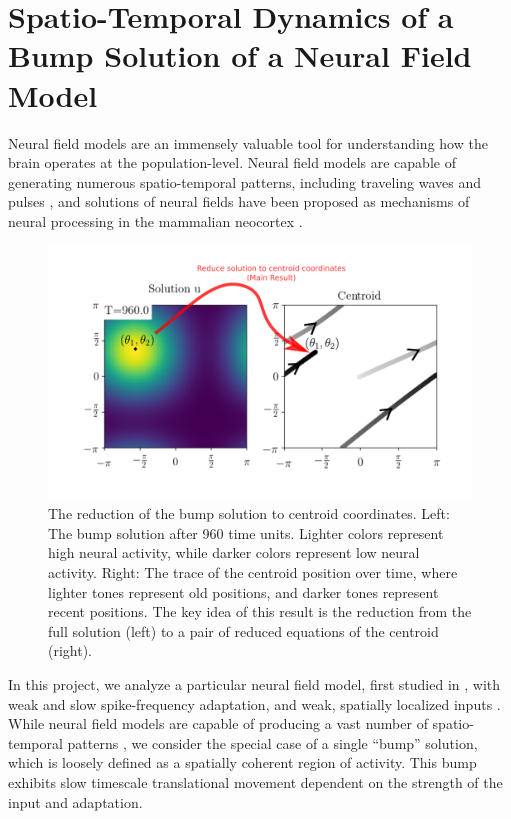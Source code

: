 \documentclass[a4paper,11pt]{article}
\begin{document}
\section{Spatio-Temporal Dynamics of a Bump Solution of a Neural Field Model}
Neural field models are an immensely valuable tool for understanding how the brain operates at the population-level. Neural field models are capable of generating numerous spatio-temporal patterns, including traveling waves and pulses \cite{coombes_bumps_2005}, and solutions of neural fields have been proposed as mechanisms of neural processing in the mammalian neocortex \cite{itskov_2011_cell,folias2011nonlinear,pinto_ermentrout_2001_siam}.

\begin{figure}
\centering
 \includegraphics[width=.75\textwidth]{bump.pdf}
 \caption{The reduction of the bump solution to centroid coordinates. Left: The bump solution after 960 time units. Lighter colors represent high neural activity, while darker colors represent low neural activity. Right: The trace of the centroid position over time, where lighter tones represent old positions, and darker tones represent recent positions. The key idea of this result is the reduction from the full solution (left) to a pair of reduced equations of the centroid (right).}
\end{figure}

In this project, we analyze a particular neural field model, first studied in \cite{pinto_ermentrout_2001_siam}, with weak and slow spike-frequency adaptation, and weak, spatially localized inputs \cite{park2018scalar}. While neural field models are capable of producing a vast number of spatio-temporal patterns \cite{breakspear2017dynamic}, we consider the special case of a single ``bump'' solution, which is loosely defined as a spatially coherent region of activity. This bump exhibits slow timescale translational movement dependent on the strength of the input and adaptation.
\end{document}
